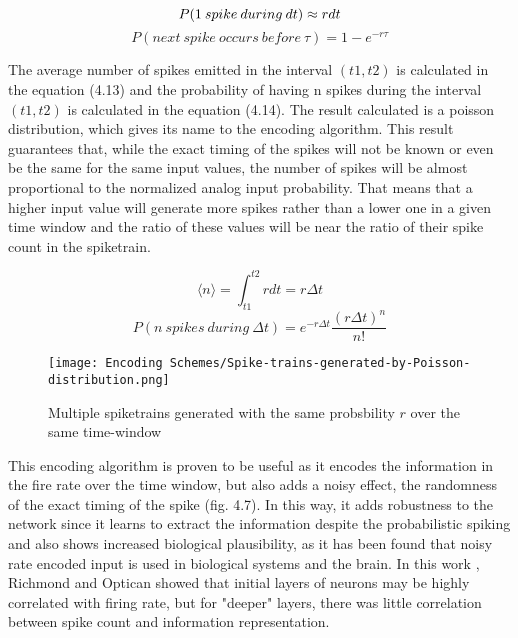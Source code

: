 \documentclass[12pt]{report}
\begin{document}
\begin{equation}
    P(1\:spike\:during\:dt) \approx rdt \\
\end{equation}
\begin{equation}
    P(next\:spike\:occurs\:before\:\tau) = 1-e^{-r\tau}
\end{equation}

\medskip

The average number of spikes emitted in the interval \((t1,t2)\) is calculated in the equation (4.13) and the probability of having n spikes during the interval \((t1,t2)\) is calculated in the equation (4.14). The result calculated is a poisson distribution, which gives its name to the encoding algorithm. This result guarantees that, while the exact timing of the spikes will not be known or even be the same for the same input values, the number of spikes will be almost proportional to the normalized analog input probability. That means that a higher input value will generate more spikes rather than a lower one in a given time window and the ratio of these values will be near the ratio of their spike count in the spiketrain. 

\begin{equation}
    \langle n \rangle = \int_{t1}^{t2}rdt = r\Delta t
\end{equation}
\begin{equation}
    P(n\:spikes\:during\:\Delta t) = e^{-r\Delta t}\frac{(r\Delta t)^n}{n!}
\end{equation}

\begin{figure}[htp]
    \centering
    \texttt{[image: Encoding Schemes/Spike-trains-generated-by-Poisson-distribution.png]}
    \caption{Multiple spiketrains generated with the same probsbility \(r\) over the same time-window}
    \label{fig:spikeprop-net-architecture}
\end{figure}

This encoding algorithm is proven to be useful as it encodes the information in the fire rate over the time window, but also adds a noisy effect, the randomness of the exact timing of the spike (fig. 4.7). In this way, it adds robustness to the network since it learns to extract the information despite the probabilistic spiking and also shows increased biological plausibility, as it has been found that noisy rate encoded input is used in biological systems and the brain. In this work \cite{Richmond1987}, Richmond and Optican showed that initial layers of neurons may be highly correlated with firing rate, but for "deeper" layers, there was little correlation between spike count and information representation. 
\end{document}
